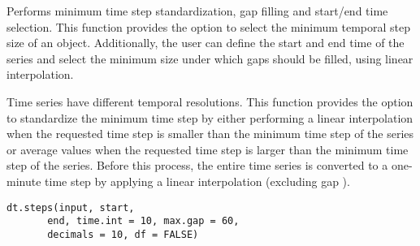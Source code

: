 \documentclass[a4paper]{book}
\begin{document}
%
\begin{Description}\relax
Performs minimum time step standardization,
gap filling and start/end time selection. This function
provides the option to select the minimum temporal step size of an
 object. Additionally, the user can define the
start and end time of the series and select the minimum size under
which gaps should be filled, using linear interpolation.

Time series have different temporal resolutions.
This function provides the option to standardize the minimum time step by
either performing a linear interpolation when the requested time step
is smaller than the minimum time step of the series or average values when
the requested time step is larger than the minimum time step of the series.
Before this process, the entire time series is converted to a one-minute time
step by applying a linear interpolation (excluding gap ).
\end{Description}
%
\begin{Usage}
\begin{verbatim}
dt.steps(input, start,
       end, time.int = 10, max.gap = 60,
       decimals = 10, df = FALSE)
\end{verbatim}
\end{Usage}
%
\end{document}
